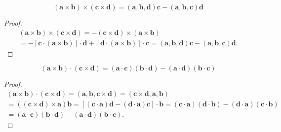 \documentclass[./main.tex]{subfiles}
\begin{document}
\begin{proposition}
    \[(\mathbf{a}\times \mathbf{b})\times (\mathbf{c}\times \mathbf{d})=(\mathbf{a},\mathbf{b},\mathbf{d})\mathbf{c}-(\mathbf{a},\mathbf{b},\mathbf{c})\mathbf{d}\] 
\end{proposition}
\begin{proof}
    \begin{multline*}
        (\mathbf{a}\times \mathbf{b})\times (\mathbf{c}\times \mathbf{d})=-(\mathbf{c}\times \mathbf{d})\times(\mathbf{a}\times \mathbf{b})\\=-[\mathbf{c}\cdot (\mathbf{a}\times \mathbf{b})]\cdot \mathbf{d}+[\mathbf{d}\cdot (\mathbf{a}\times \mathbf{b})]\cdot \mathbf{c}=(\mathbf{a},\mathbf{b},\mathbf{d})\mathbf{c}-(\mathbf{a},\mathbf{b},\mathbf{c})\mathbf{d}.
    \end{multline*}
\end{proof}
\begin{proposition}
\[(\mathbf{a}\times \mathbf{b})\cdot (\mathbf{c}\times \mathbf{d})=(\mathbf{a}\cdot \mathbf{c})(\mathbf{b}\cdot \mathbf{d})-(\mathbf{a}\cdot \mathbf{d})(\mathbf{b}\cdot \mathbf{c})\]
\end{proposition}
\begin{proof}
    \begin{multline*}
        (\mathbf{a}\times \mathbf{b})\cdot (\mathbf{c}\times \mathbf{d})=(\mathbf{a},\mathbf{b},\mathbf{c}\times \mathbf{d})=(\mathbf{c}\times \mathbf{d},\mathbf{a},\mathbf{b})\\=((\mathbf{c}\times \mathbf{d})\times \mathbf{a})\mathbf{b}=[(\mathbf{c}\cdot \mathbf{a})\mathbf{d}-(\mathbf{d}\cdot \mathbf{a})\mathbf{c}]\cdot \mathbf{b}=(\mathbf{c}\cdot \mathbf{a})(\mathbf{d}\cdot \mathbf{b})-(\mathbf{d}\cdot \mathbf{a})(\mathbf{c}\cdot \mathbf{b})\\=(\mathbf{a}\cdot \mathbf{c})(\mathbf{b}\cdot \mathbf{d})-(\mathbf{a}\cdot \mathbf{d})(\mathbf{b}\cdot \mathbf{c}).
    \end{multline*}
\end{proof}
\end{document}

